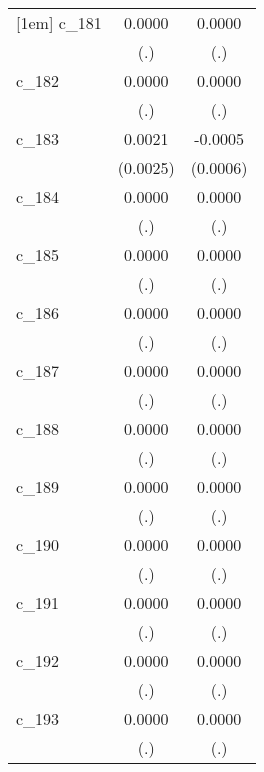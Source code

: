 {\begin{tabular}{l*{2}{c}}
[1em]
c\_181       &      0.0000        &      0.0000        \\
            &         (.)        &         (.)        \\
[1em]
c\_182       &      0.0000        &      0.0000        \\
            &         (.)        &         (.)        \\
[1em]
c\_183       &      0.0021        &     -0.0005        \\
            &    (0.0025)        &    (0.0006)        \\
[1em]
c\_184       &      0.0000        &      0.0000        \\
            &         (.)        &         (.)        \\
[1em]
c\_185       &      0.0000        &      0.0000        \\
            &         (.)        &         (.)        \\
[1em]
c\_186       &      0.0000        &      0.0000        \\
            &         (.)        &         (.)        \\
[1em]
c\_187       &      0.0000        &      0.0000        \\
            &         (.)        &         (.)        \\
[1em]
c\_188       &      0.0000        &      0.0000        \\
            &         (.)        &         (.)        \\
[1em]
c\_189       &      0.0000        &      0.0000        \\
            &         (.)        &         (.)        \\
[1em]
c\_190       &      0.0000        &      0.0000        \\
            &         (.)        &         (.)        \\
[1em]
c\_191       &      0.0000        &      0.0000        \\
            &         (.)        &         (.)        \\
[1em]
c\_192       &      0.0000        &      0.0000        \\
            &         (.)        &         (.)        \\
[1em]
c\_193       &      0.0000        &      0.0000        \\
            &         (.)        &         (.)        \\

\end{tabular}}
